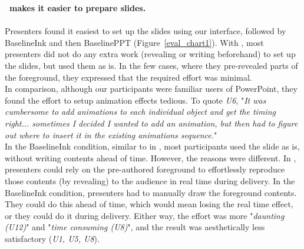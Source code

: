 \textbf{\interface\ makes it easier to prepare slides.}\\
\\
Presenters found it easiest to set up the slides using our interface, followed by BaselineInk and then BaselinePPT (Figure~\ref{eval_chart1}). With \interface, most presenters did not do any extra work (revealing or writing beforehand) to set up the slides, but used them as is. In the few cases, where they pre-revealed parts of the foreground, they expressed that the required effort was minimal. \\
In comparison, although our participants were familiar users of PowerPoint, they found the effort to setup animation effects tedious. To quote \textit{U6}, "\textit{It was cumbersome to add animations to each individual object and get the timing right... sometimes I decided I wanted to add an animation, but then had to figure out where to insert it in the existing animations sequence.}"\\
In the BaselineInk condition, similar to in \interface, most participants used the slide as is, without writing contents ahead of time. However, the reasons were different. In \interface, presenters could rely on the pre-authored foreground to effortlessly reproduce those contents (by revealing) to the audience in real time during delivery. In the BaselineInk condition, presenters had to manually draw the foreground contents. They could do this ahead of time, which would mean losing the real time effect, or they could do it during delivery. Either way, the effort was more "\textit{daunting (U12)}" and  "\textit{time consuming (U8)}", and the result was aesthetically less satisfactory (\textit{U1, U5, U8}).  


